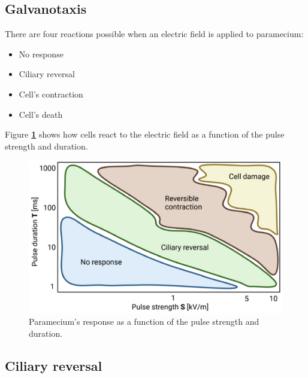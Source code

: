 \noindent
\begin{minipage}{0.49\textwidth}

\vspace{1.2em}

\subsection{Galvanotaxis}
There are four reactions possible when an electric field is applied to paramecium:

\begin{itemize}
    \item No response
    \item Ciliary reversal
    \item Cell's contraction
    \item Cell's death
\end{itemize}

Figure \textbf{\ref{fig:cell_response}} shows how cells react to the electric field as a function of the pulse strength and duration.

\end{minipage}
\hfill
\begin{minipage}{0.49\textwidth}
    \begin{figure}[H]
    \centering 
    \captionsetup{width=0.9\linewidth, justification=centering}
    \includegraphics[width=1\textwidth]{Figures/Cell_response.png}
    \caption{Paramecium's response as a function of the pulse strength and duration. \cite{Notice}}
    \label{fig:cell_response}
    \end{figure}
\end{minipage}



\subsection{Ciliary reversal}

